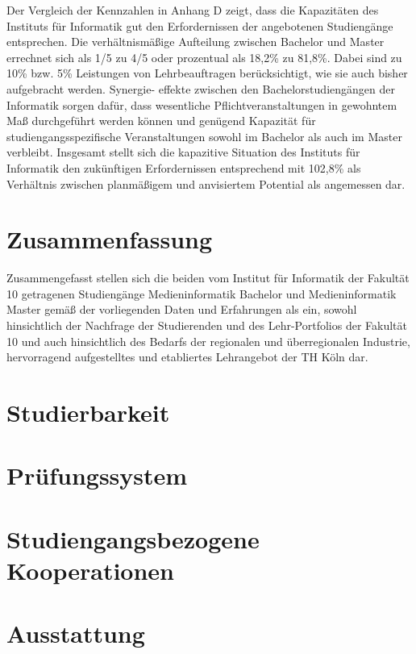 Der Vergleich der Kennzahlen in Anhang D zeigt, dass die Kapazitäten des
Instituts für Informatik gut den Erfordernissen der angebotenen
Studiengänge entsprechen. Die verhältnismäßige Aufteilung zwischen
Bachelor und Master errechnet sich als 1/5 zu 4/5 oder prozentual als
18,2\% zu 81,8\%. Dabei sind zu 10\% bzw. 5\% Leistungen von
Lehrbeauftragen berücksichtigt, wie sie auch bisher aufgebracht werden.
Synergie- effekte zwischen den Bachelorstudiengängen der Informatik
sorgen dafür, dass wesentliche Pflichtveranstaltungen in gewohntem Maß
durchgeführt werden können und genügend Kapazität für
studiengangsspezifische Veranstaltungen sowohl im Bachelor als auch im
Master verbleibt. Insgesamt stellt sich die kapazitive Situation des
Instituts für Informatik den zukünftigen Erfordernissen entsprechend mit
102,8\% als Verhältnis zwischen planmäßigem und anvisiertem Potential
als angemessen dar.

\chapter{Zusammenfassung}\label{zusammenfassung}

Zusammengefasst stellen sich die beiden vom Institut für Informatik der
Fakultät 10 getragenen Studiengänge Medieninformatik Bachelor und
Medieninformatik Master gemäß der vorliegenden Daten und Erfahrungen als
ein, sowohl hinsichtlich der Nachfrage der Studierenden und des
Lehr-Portfolios der Fakultät 10 und auch hinsichtlich des Bedarfs der
regionalen und überregionalen Industrie, hervorragend aufgestelltes und
etabliertes Lehrangebot der TH Köln dar.

\chapter{Studierbarkeit}\label{studierbarkeit}

\chapter{Prüfungssystem}\label{pruxfcfungssystem}

\chapter{Studiengangsbezogene
Kooperationen}\label{studiengangsbezogene-kooperationen}

\chapter{Ausstattung}\label{ausstattung}

